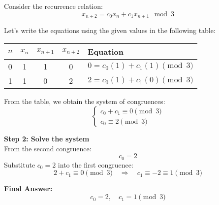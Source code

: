 \documentclass[12pt]{article}
\begin{document}
Consider the recurrence relation:
\[
x_{n+2} = c_0 x_n + c_1 x_{n+1} \mod 3
\]

Let's write the equations using the given values in the following table:

\begin{center}
\begin{tabular}{|c|c|c|c|l|}
\hline
\( n \) & \( x_n \) & \( x_{n+1} \) & \( x_{n+2} \) & Equation \\
\hline
0 & 1 & 1 & 0 & \( 0 = c_0 (1) + c_1 (1) \pmod{3} \) \\
1 & 1 & 0 & 2 & \( 2 = c_0 (1) + c_1 (0) \pmod{3} \) \\
\hline
\end{tabular}
\end{center}

From the table, we obtain the system of congruences:
\[
\begin{cases}
c_0 + c_1 \equiv 0 \pmod{3} \\
c_0 \equiv 2 \pmod{3}
\end{cases}
\]

\textbf{Step 2: Solve the system} \\
From the second congruence:
\[
c_0 = 2
\]
Substitute \( c_0 = 2 \) into the first congruence:
\[
2 + c_1 \equiv 0 \pmod{3} \quad \Rightarrow \quad c_1 \equiv -2 \equiv 1 \pmod{3}
\]

\textbf{Final Answer:} \\
\[
c_0 = 2, \quad c_1 = 1 \pmod{3}
\]
\end{document}
